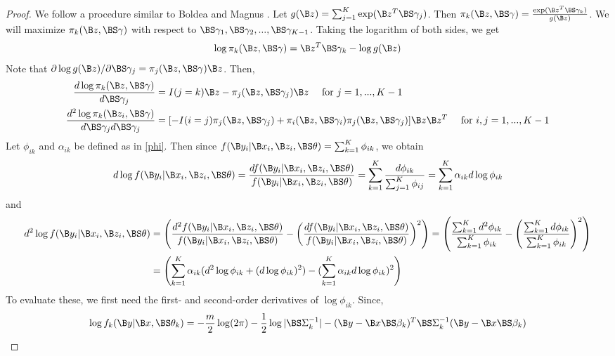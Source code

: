 \begin{proof}
We follow a procedure similar to Boldea and Magnus \cite{boldea2009}. Let $g(\B  z)=\sum_{j=1}^{K}\exp(\B  z^{T}\BS \gamma_{j})$. Then $\pi_{k}(\B z,\BS\gamma)=\frac{\exp( \B  z^{T}\BS\gamma_{k})}{g(\B  z)}$. We will maximize $\pi_{k}(\B z,\BS\gamma)$ with respect to $\BS\gamma_{1},\BS\gamma_{2},...,\BS\gamma_{K-1}$. Taking the logarithm of both sides, we get
\begin{align}
\log \pi_{k}(\B z,\BS\gamma)=\B z^{T}\BS\gamma_{k} - \log g(\B z)
\label{wts}
\end{align}
Note that $\partial\log g(\B z)/\partial \BS \gamma_{j}=\pi_{j}(\B z,\BS\gamma) \B z$. Then,
\begin{align}
\frac{d\log\pi_{k}(\B z,\BS\gamma)}{d\BS\gamma_{j}}&=I(j=k)\B z-\pi_{j}(\B z,\BS\gamma_{j})\B z\quad\text{ for }j=1,...,K-1\nonumber\\
\frac{d^{2}\log\pi_{k}(\B z_{i},\BS\gamma)}{d\BS\gamma_{j}d\BS\gamma_{j}}&=[-I(i=j)\pi_{j}(\B z,\BS\gamma_{j})+\pi_{i}(\B z,\BS\gamma_{i})\pi_{j}(\B z,\BS\gamma_{j})]\B z\B z^{T}\quad\text{ for }i,j=1,...,K-1
\label{logpi}
\end{align}
Let $\phi_{ik}$ and $\alpha_{ik}$ be defined as in \eqref{phi}. Then since $f(\B y_{i}|\B x_{i},\B z_{i},\BS\theta)=\sum^{K}_{k=1}\phi_{ik}$, we obtain
\begin{align}
d\log f(\B y_{i}|\B x_{i},\B z_{i},\BS\theta)=\frac{d f(\B y_{i}|\B x_{i},\B z_{i},\BS\theta)}{f(\B y_{i}|\B x_{i},\B z_{i},\BS\theta)}=\sum^{K}_{k=1}\frac{d\phi_{ik}}{\sum^{K}_{j=1}\phi_{ij}}=\sum^{K}_{k=1}\alpha_{ik}d\log \phi_{ik}\label{dlogf}
\end{align}
and 
\begin{align}\label{d2logf}
d^{2}\log f(\B y_{i}|\B x_{i},\B z_{i},\BS\theta)&=\left(\frac{d^{2} f(\B y_{i}|\B x_{i},\B z_{i},\BS\theta)}{f(\B y_{i}|\B x_{i},\B z_{i},\BS\theta)}-\left(\frac{d f(\B y_{i}|\B x_{i},\B z_{i},\BS\theta)}{f(\B y_{i}|\B x_{i},\B z_{i},\BS\theta)}\right)^{2}\right)=\left(\frac{\sum^{K}_{k=1}d^{2}\phi_{ik}}{\sum^{K}_{k=1}\phi_{ik}}-\left(\frac{\sum^{K}_{k=1}d \phi_{ik}}{\sum^{K}_{k=1}\phi_{ik}}\right)^{2}\right)\nonumber\\
&=\left(\sum^{K}_{k=1}\alpha_{ik}(d^{2}\log \phi_{ik}+(d\log \phi_{ik})^{2})-(\sum^{K}_{k=1}\alpha_{ik}d\log \phi_{ik})^{2}\right)
\end{align}
To evaluate these, we first need the first- and second-order derivatives of $\log \phi_{ik}$.  Since, 
\begin{align*}
\log f_{k}(\B y|\B x,\BS\theta_{k})=-\frac{m}{2}\log(2\pi)-\frac{1}{2}\log |\BS\Sigma_{k}^{-1}|-(\B y-\B x\BS \beta_{k})^{T}\BS\Sigma_{k}^{-1}(\B y-\B x\BS\beta_{k})

\end{align*}
\end{proof}
